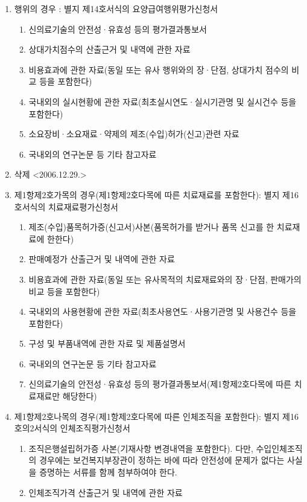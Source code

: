 \begin{enumerate}[①]
	\begin{enumerate}[1.]\tightlist
	\item 행위의 경우 : 별지 제14호서식의 요양급여행위평가신청서
		\begin{enumerate}[가.]\tightlist
		\item 신의료기술의 안전성·유효성 등의 평가결과통보서
		\item 상대가치점수의 산출근거 및 내역에 관한 자료
		\item 비용효과에 관한 자료(동일 또는 유사 행위와의 장·단점, 상대가치 점수의 비교 등을 포함한다)
		\item 국내외의 실시현황에 관한 자료(최초실시연도·실시기관명 및 실시건수 등을 포함한다)
		\item 소요장비·소요재료·약제의 제조(수입)허가(신고)관련 자료
		\item 국내외의 연구논문 등 기타 참고자료
		\end{enumerate}		
	\item 삭제  <2006.12.29.>
	\item 제1항제2호가목의 경우(제1항제2호다목에 따른 치료재료를 포함한다): 별지 제16호서식의 치료재료평가신청서
		\begin{enumerate}[가.]\tightlist
		\item 제조(수입)품목허가증(신고서)사본(품목허가를 받거나 품목 신고를 한 치료재료에 한한다)
		\item 판매예정가 산출근거 및 내역에 관한 자료
		\item 비용효과에 관한 자료(동일 또는 유사목적의 치료재료와의 장·단점, 판매가의 비교 등을 포함한다)
		\item 국내외의 사용현황에 관한 자료(최초사용연도·사용기관명 및 사용건수 등을 포함한다)
		\item 구성 및 부품내역에 관한 자료 및 제품설명서
		\item 국내외의 연구논문 등 기타 참고자료
		\item 신의료기술의 안전성·유효성 등의 평가결과통보서(제1항제2호다목에 따른 치료재료만 해당한다)
		\end{enumerate}
	\item 제1항제2호나목의 경우(제1항제2호다목에 따른 인체조직을 포함한다): 별지 제16호의2서식의 인체조직평가신청서
		\begin{enumerate}[가.]\tightlist
		\item 조직은행설립허가증 사본(기재사항 변경내역을 포함한다). 다만, 수입인체조직의 경우에는 보건복지부장관이 정하는 바에 따라 안전성에 문제가 없다는 사실을 증명하는 서류를 함께 첨부하여야 한다.
		\item 인체조직가격 산출근거 및 내역에 관한 자료

\end{enumerate}
\end{enumerate}
\end{enumerate}
